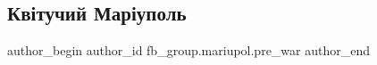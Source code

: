  
 
 
 
 

\subsection{Квітучий Маріуполь}
\label{sec:20_02_2023.fb.fb_group.mariupol.pre_war.2.kv_tuchii_mar_upol}

\ifcmt
 author_begin
   author_id fb_group.mariupol.pre_war
 author_end
\fi
